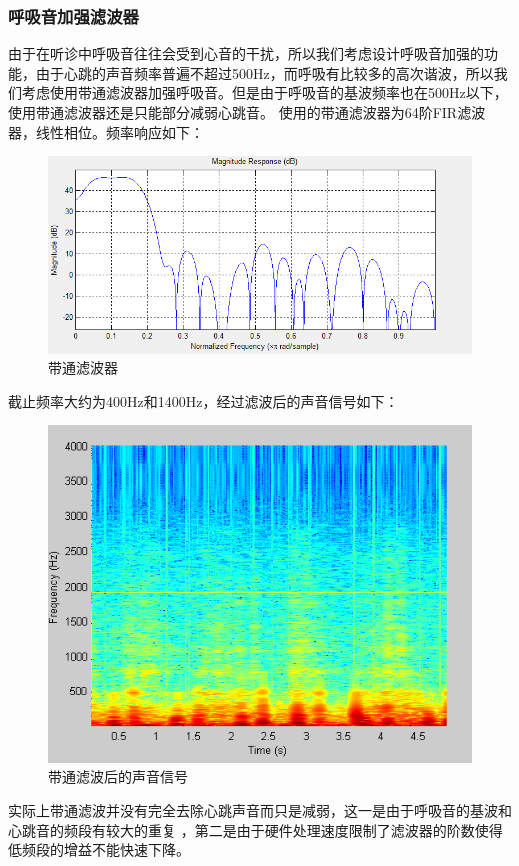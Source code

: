 \documentclass[16pt,a4paper]{article}
\begin{document}
\subsubsection{呼吸音加强滤波器}
由于在听诊中呼吸音往往会受到心音的干扰，所以我们考虑设计呼吸音加强的功能，由于心跳的声音频率普遍不超过500Hz，而呼吸有比较多的高次谐波，所以我们考虑使用带通滤波器加强呼吸音。但是由于呼吸音的基波频率也在500Hz以下，使用带通滤波器还是只能部分减弱心跳音。
使用的带通滤波器为64阶FIR滤波器，线性相位。频率响应如下：
\begin{figure}[H]
\centering
\includegraphics[scale = 0.7]{band_pass.png}
\caption{带通滤波器} 
\end{figure}
截止频率大约为400Hz和1400Hz，经过滤波后的声音信号如下：
\begin{figure}[H]
\centering
\includegraphics[scale = 1]{band_passed.png}
\caption{带通滤波后的声音信号} 
\end{figure}
实际上带通滤波并没有完全去除心跳声音而只是减弱，这一是由于呼吸音的基波和心跳音的频段有较大的重复 	，第二是由于硬件处理速度限制了滤波器的阶数使得低频段的增益不能快速下降。
\end{document}
